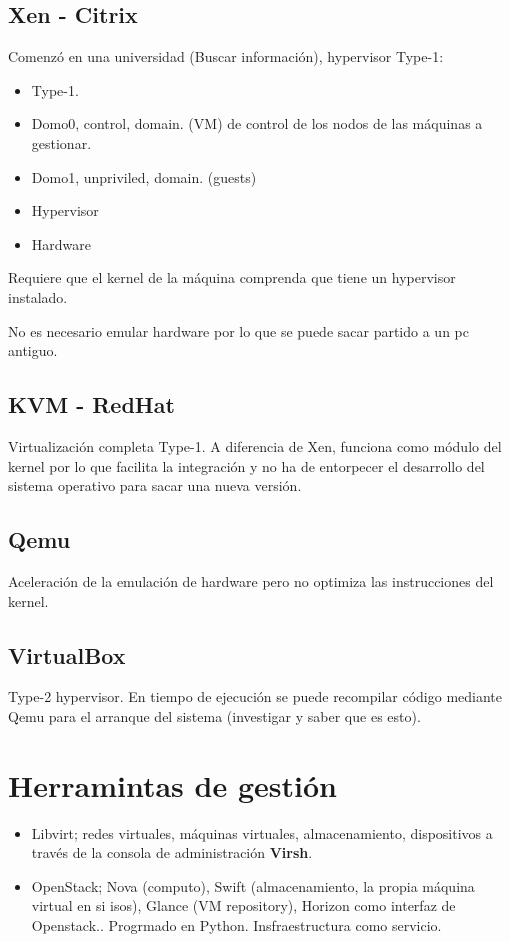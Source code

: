 \documentclass[11pt]{article}
\begin{document}
\subsection{Xen - Citrix}

Comenzó en una universidad (Buscar información), hypervisor Type-1:

\begin{itemize}
    \item Type-1.
    \item Domo0, control, domain. (VM) de control de los nodos de las máquinas a gestionar.
    \item Domo1, unpriviled, domain. (guests)
    \item Hypervisor
    \item Hardware
\end{itemize}

Requiere que el kernel de la máquina comprenda que tiene un hypervisor instalado.

No es necesario emular hardware por lo que se puede sacar partido a un pc antiguo.

\subsection{KVM - RedHat}

Virtualización completa Type-1. A diferencia de Xen, funciona como módulo del kernel por lo que facilita la integración y no ha de entorpecer el desarrollo del sistema operativo para sacar una nueva versión.

\subsection{Qemu}

Aceleración de la emulación de hardware pero no optimiza las instrucciones del kernel.

\subsection{VirtualBox}

Type-2 hypervisor. En tiempo de ejecución se puede recompilar código mediante Qemu para el arranque del sistema (investigar y saber que es esto).

\section{Herramintas de gestión}

\begin{itemize}
    \item Libvirt; redes virtuales, máquinas virtuales, almacenamiento, dispositivos a través de la consola de administración \textbf{Virsh}.
    \item OpenStack; Nova (computo), Swift (almacenamiento, la propia máquina virtual en si isos), Glance (VM repository), Horizon como interfaz de Openstack.. Progrmado en Python. Insfraestructura como servicio.
\end{itemize}
\end{document}
